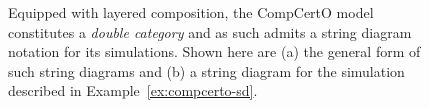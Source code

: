 \documentclass[acmsmall,screen,review,anonymous]{acmart}
\newcommand{\kw}[1]{\ensuremath{ \mathsf{#1} }}
\begin{document}
\begin{figure}
{}
  \caption{
    Equipped with layered composition,
    the CompCertO model constitutes a \emph{double category}
    and as such admits a string diagram notation for its simulations.
    Shown here are (a) the general form of such string diagrams and
    (b) a string diagram for the simulation described in Example~\ref{ex:compcerto-sd}.}
  \label{fig:compcerto}
\end{figure}
\end{document}
